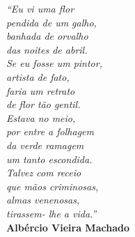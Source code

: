 \begin{epigrafe}
\vspace*{\fill}

\begin{flushright}
    \hspace{7.5cm}
    \textit{
        ``Eu vi uma flor\\
pendida de um galho,\\
banhada de orvalho\\
das noites de abril.\\[5pt]
Se eu fosse um pintor,\\
artista de fato,\\
faria um retrato\\
de flor tão gentil.\\[5pt]
Estava no meio,\\
por entre a folhagem \\
da verde ramagem \\
um tanto escondida.\\[5pt]
Talvez com receio\\
que mãos criminosas,\\
almas venenosas,\\
tirassem- lhe a vida.''} \\
        \textbf{Albércio Vieira Machado}
\end{flushright}
\end{epigrafe}